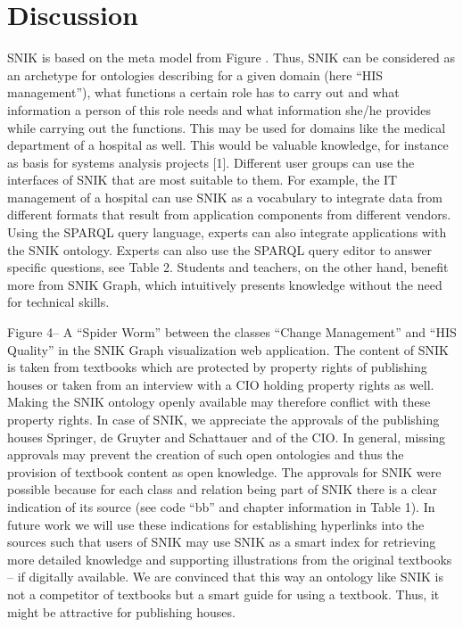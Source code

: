 \documentclass{IOS-Book-Article}     %
\begin{document}
\section{Discussion}
SNIK is based on the meta model from Figure .
Thus, SNIK can be considered as an archetype for ontologies describing for a given domain (here \enquote{HIS management}), what functions a certain role has to carry out and what information a person of this role needs and what information she/he provides while carrying out the functions.
This may be used for domains like the medical department of a hospital as well.
This would be valuable knowledge, for instance as basis for systems analysis projects [1].
Different user groups can use the interfaces of SNIK that are most suitable to them.
For example, the IT management of a hospital can use SNIK as a vocabulary to integrate data from different formats that result from application components from different vendors.
Using the SPARQL query language, experts can also integrate applications with the SNIK ontology.
 Experts can also use the SPARQL query editor to answer specific questions, see Table 2.
Students and teachers, on the other hand, benefit more from SNIK Graph, which intuitively presents knowledge without the need for technical skills.

Figure 4– A \enquote{Spider Worm} between the classes \enquote{Change Management} and \enquote{HIS Quality} in the SNIK Graph visualization web application.
The content of SNIK is taken from textbooks which are protected by property rights of publishing houses or taken from an interview with a CIO holding property rights as well.
Making the SNIK ontology openly available may therefore conflict with these property rights.
In case of SNIK, we appreciate the approvals of the publishing houses Springer, de Gruyter and Schattauer and of the CIO.
In general, missing approvals may prevent the creation of such open ontologies and thus the provision of textbook content as open knowledge.
The approvals for SNIK were possible because for each class and relation being part of SNIK there is a clear indication of its source (see code \enquote{bb} and chapter information in Table 1).
In future work we will use these indications for establishing hyperlinks into the sources such that users of SNIK may use SNIK as a smart index for retrieving more detailed knowledge and supporting illustrations from the original textbooks – if digitally available.
We are convinced that this way an ontology like SNIK is not a competitor of textbooks but a smart guide for using a textbook.
Thus, it might be attractive for publishing houses.
\fi
{}
\end{document}
